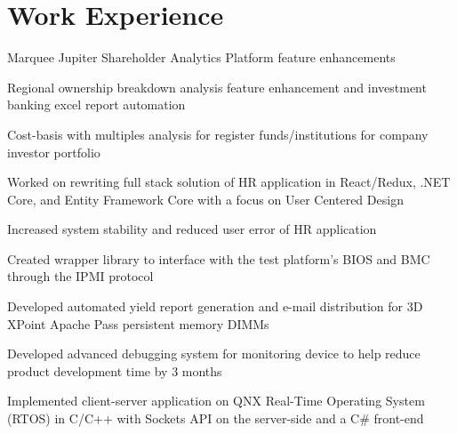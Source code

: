 \documentclass[]{deedy-resume-openfont}
\begin{document}
	\begin{minipage}[t]{0.66\textwidth} 
		
		
		\section{Work Experience}
		
		\vspace{\topsep} %
		\begin{tightemize}\item Marquee Jupiter Shareholder Analytics Platform feature enhancements \item Regional ownership breakdown analysis feature enhancement and investment banking excel report automation \item Cost-basis with multiples analysis for register funds/institutions for company investor portfolio
		\end{tightemize}
		\sectionsep
		
		\begin{tightemize}\item Worked on rewriting full stack solution of HR application in React/Redux, .NET Core, and Entity Framework Core with a focus on User Centered Design \item Increased system stability and reduced user error of HR application
		\end{tightemize}
		\sectionsep
		
		\begin{tightemize}
			\item Created wrapper library to interface with the test platform’s BIOS and BMC through the IPMI protocol \item Developed automated yield report generation and e-mail distribution for 3D XPoint Apache Pass persistent memory DIMMs\end{tightemize}
		\sectionsep
		
		\begin{tightemize}
			\item Developed advanced debugging system for monitoring device to help reduce product development time by 3 months\item Implemented client-server application on QNX Real-Time Operating System (RTOS) in C/C++ with Sockets API on the server-side and  a C\# front-end \end{tightemize}
		\sectionsep
		

\end{minipage}
\end{document}
